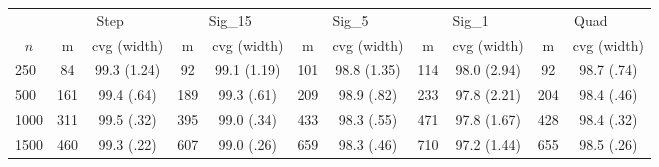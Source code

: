 \begin{tabular}{lcccccccccc}
   \toprule
 
           & \multicolumn{2}{c}{Step}& \multicolumn{2}{c}{Sig\_15}& \multicolumn{2}{c}{Sig\_5}& \multicolumn{2}{c}{Sig\_1}& \multicolumn{2}{c}{Quad} \\ 
             \cmidrule(l{2pt}r{2pt}){2-3} \cmidrule(l{2pt}r{2pt}){4-5} \cmidrule(l{2pt}r{2pt}){6-7} \cmidrule(l{2pt}r{2pt}){8-9}  \cmidrule(l{2pt}r{2pt}){10-11} 
             \multicolumn{1}{c}{$n$} & \multicolumn{1}{c}{m}& \multicolumn{1}{c}{cvg (width)}& \multicolumn{1}{c}{m}& \multicolumn{1}{c}{cvg (width)}& \multicolumn{1}{c}{m}& \multicolumn{1}{c}{cvg (width)}& \multicolumn{1}{c}{m}& \multicolumn{1}{c}{cvg (width)}& \multicolumn{1}{c}{m}& \multicolumn{1}{c}{cvg (width)} \\ \midrule 
        250 & 84 & 99.3 (1.24) & 92 & 99.1 (1.19) & 101 & 98.8 (1.35) & 114 & 98.0 (2.94) & 92 & 98.7 (.74) \\ 
  500 & 161 & 99.4 (.64) & 189 & 99.3 (.61) & 209 & 98.9 (.82) & 233 & 97.8 (2.21) & 204 & 98.4 (.46) \\ 
  1000 & 311 & 99.5 (.32) & 395 & 99.0 (.34) & 433 & 98.3 (.55) & 471 & 97.8 (1.67) & 428 & 98.4 (.32) \\ 
  1500 & 460 & 99.3 (.22) & 607 & 99.0 (.26) & 659 & 98.3 (.46) & 710 & 97.2 (1.44) & 655 & 98.5 (.26) \\ 
   \hline
\end{tabular}

